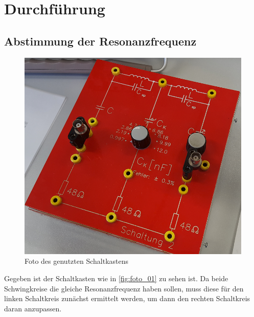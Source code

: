 \section{Durchführung}
\label{sec:Durchführung}


\subsection{Abstimmung der Resonanzfrequenz}
\label{sec:resonanz}

\begin{figure}
    \centering
    \includegraphics[width=\textwidth/2]{images/foto_01.png}
    \caption{Foto des genutzten Schaltkastens}
    \label{fig:foto_01}
\end{figure}
Gegeben ist der Schaltkasten wie in \autoref{fig:foto_01} zu sehen ist.
Da beide Schwingkreise die gleiche Resonanzfrequenz haben sollen, muss diese für den linken Schaltkreis zunächst ermittelt werden, um dann den rechten Schaltkreis daran anzupassen.\\
